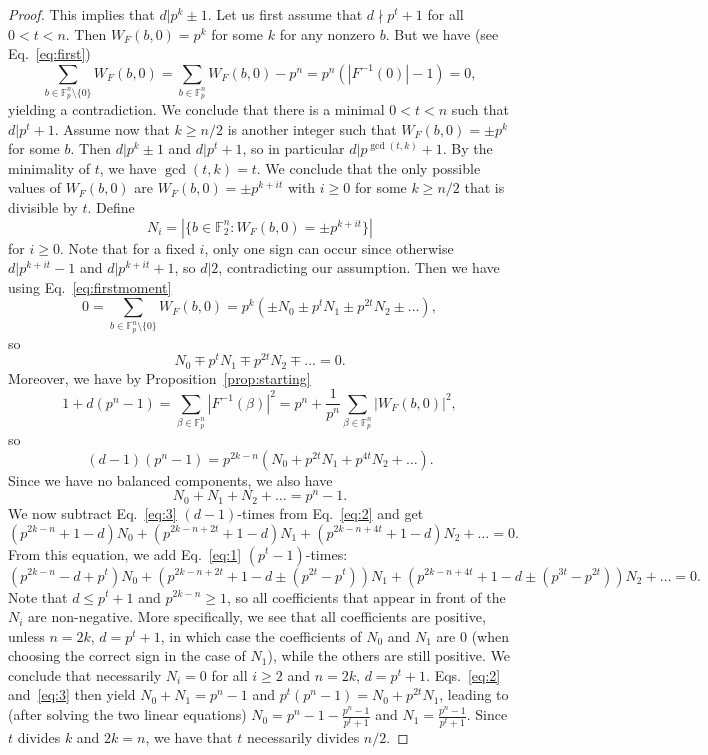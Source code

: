 \documentclass[11pt]{article}
\newcommand{\F}{\mathbb F}
\theoremstyle{plain}
\theoremstyle{definition}
\numberwithin{theorem}{section}
\numberwithin{equation}{section}
\numberwithin{table}{section}
\numberwithin{figure}{section}
\begin{document}
{\begin{proof}
    This implies that $d|p^{k}\pm 1$. 
    Let us first assume that $d\nmid p^t+1$ for all $0<t<n$. Then $W_F(b,0) =  p^{k}$ for some $k$ for any nonzero $b$. But we have (see Eq.~\eqref{eq:first})
    \begin{equation} \label{eq:firstmoment}
        \sum_{b \in \F_p^n \setminus \{0\}}W_F(b,0) =\sum_{b \in \F_p^n}W_F(b,0)-p^n = p^n(|F^{-1}(0)|-1)=0,
    \end{equation}
    yielding a contradiction. We conclude that there is a minimal $0<t<n$ such that $d|p^t+1$.  Assume now that $k\geq n/2$ is another integer such that $W_F(b,0)= \pm p^{k}$ for some $b$. Then $d|p^{k} \pm 1$ and $d|p^t+1$, so in particular $d|p^{\gcd(t,k)}+1$. By the minimality of $t$, we have $\gcd(t,k)=t$. We conclude that the only possible values of $W_F(b,0)$ are $W_F(b,0)= \pm p^{k+it}$ with $i \geq 0$ for some $k \geq n/2$ that is divisible by $t$. Define 
    \[N_i = |\{b\in \F_2^n \colon W_F(b,0)=\pm p^{k+it}\}|\]
    for $i\geq 0$. {Note that for a fixed $i$, only one sign can occur since otherwise $d|p^{k+it}-1$ and $d|p^{k+it}+1$, so $d|2$, contradicting our assumption.} 
    Then we have using Eq.~\eqref{eq:firstmoment}
    \[0=\sum_{b \in \F_p^n \setminus \{0\}}W_F(b,0) = p^{k}(\pm N_0\pm p^tN_1 \pm p^{2t}N_2\pm \dots),\]
    so 
    \begin{equation} \label{eq:1}
        N_0\mp p^tN_1 \mp p^{2t}N_2\mp \dots =0.
    \end{equation}
    Moreover, we have by Proposition~\ref{prop:starting}
    \[    1+d(p^n-1)=\sum_{\beta \in \F_{p}^n} |F^{-1}(\beta)|^2 = p^n + \frac{1}{p^n}\sum_{\beta \in \F_p^n}|W_F(b,0)|^2,
    \]
    so 
    \begin{equation} \label{eq:2}
        (d-1)(p^n-1)=p^{2k-n}(N_0+p^{2t}N_1+p^{4t}N_2+\dots).
    \end{equation}
    Since we have no balanced components, we also have
    \begin{equation} \label{eq:3}
        {N_0}+N_1+N_2+\dots = p^n-1.
    \end{equation}
    We now subtract Eq.~\eqref{eq:3} $(d-1)$-times from Eq.~\eqref{eq:2} and get
    \[(p^{2k-n}+1-d)N_0+(p^{2k-n+2t}+1-d)N_1 + (p^{2k-n+4t}+1-d)N_2+\dots=0.\]
    From this equation, we add Eq.~\eqref{eq:1} $(p^t-1)$-times:
    \[(p^{2k-n}-d+p^t)N_0+(p^{2k-n+2t}+1-d\pm (p^{2t}- p^t))N_1+(p^{2k-n+4t}+1-d\pm(p^{3t}-p^{2t}))N_2+\dots =0.\]
    Note that $d\leq p^t+1$ and $p^{2k-n}\geq 1$, so all coefficients that appear in front of the $N_i$ are non-negative. More specifically, we see that all coefficients are positive, unless $n=2k$, $d=p^t+1$, in which case the coefficients of $N_0$ and $N_1$ are $0$ (when choosing the correct sign in the case of $N_1$), while the others are still positive. We conclude that necessarily $N_i=0$ for all $i \geq 2$ and $n=2k$, $d=p^t+1$. Eqs.~\eqref{eq:2} and~\eqref{eq:3} then yield $N_0+N_1=p^n-1$ and $p^t(p^n-1)=N_0+p^{2t}N_1$, leading to (after solving the two linear equations) $N_0=p^n-1-\frac{p^n-1}{p^t+1}$ and $N_1=\frac{p^n-1}{p^t+1}$. Since $t$ divides $k$ and $2k=n$, we have that $t$ necessarily divides $n/2$.
\end{proof}

}
\end{document}
